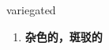 
\begin{frame}
{\huge variegated}
\begin{center}
\begin{enumerate}\Large
  \item \textbf{杂色的，斑驳的}
\end{enumerate}
\end{center}
\end{frame}
